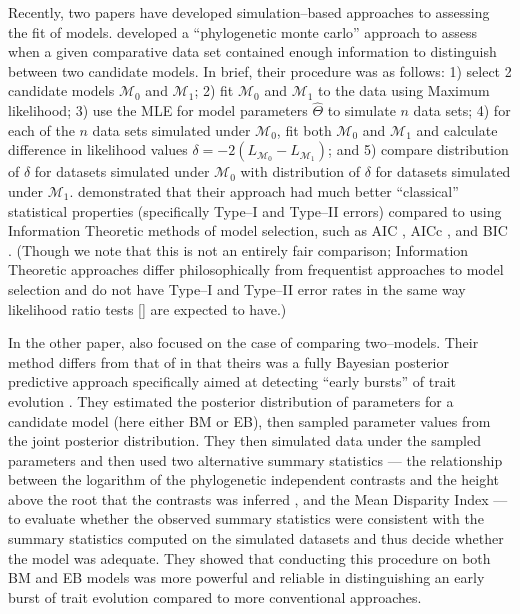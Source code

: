 \documentclass[12pt]{article}
\begin{document}
Recently, two papers have developed simulation--based approaches to assessing the fit of models. \citet{Boettiger2012} developed a ``phylogenetic monte carlo'' approach to assess when a given comparative data set contained enough information to distinguish between two candidate models. In brief, their procedure was as follows: 1) select 2 candidate models $\mathcal{M}_0$ and $\mathcal{M}_1$; 2) fit $\mathcal{M}_0$ and $\mathcal{M}_1$ to the data using Maximum likelihood; 3) use the MLE for model parameters $\hat{\Theta}$ to simulate $n$ data sets; 4) for each of the $n$ data sets simulated under $\mathcal{M}_0$, fit both $\mathcal{M}_0$ and $\mathcal{M}_1$ and calculate difference in likelihood values $\delta = -2(L_{\mathcal{M}_0} - L_{\mathcal{M}_1})$; and 5) compare distribution of $\delta$ for datasets simulated under $\mathcal{M}_0$ with distribution of $\delta$ for datasets simulated under $\mathcal{M}_1$. \citet{Boettiger2012} demonstrated that their approach had much better ``classical'' statistical properties (specifically Type--I and Type--II errors) compared to using Information Theoretic methods of model selection, such as AIC \citep{Akaike1973}, AICc \citep{AICC}, and BIC \citep{Schwarz1978}. (Though we note that this is not an entirely fair comparison; Information Theoretic approaches differ philosophically from frequentist approaches to model selection  and do not have Type--I and Type--II error rates in the same way likelihood ratio tests [\citealt{Wilks1938}] are expected to have.)

In the other paper, \citet{SlaterPennell} also focused on the case of comparing two--models. Their method differs from that of \citet{Boettiger2012} in that theirs was a fully Bayesian posterior predictive approach specifically aimed at detecting ``early bursts'' of trait evolution \citep[\textit{sensu}][]{Simpson1944, Harmon2010}. They estimated the posterior distribution of parameters for a candidate model (here either BM or EB), then sampled parameter values from the joint posterior distribution. They then simulated data under the sampled parameters and then used two alternative summary statistics --- the relationship between the logarithm of the phylogenetic independent contrasts and the height above the root that the contrasts was inferred \citep[a.k.a. the ``node height test'';][]{FreckletonHarvey2006}, and the Mean Disparity Index \citep[MDI;][]{Harmon2003, Slater2010} --- to evaluate whether the observed summary statistics were consistent with the summary statistics computed on the simulated datasets and thus decide whether the model was adequate. They showed that conducting this procedure on both BM and EB models was more powerful and reliable in distinguishing an early burst of trait evolution compared to more conventional approaches.
\end{document}
